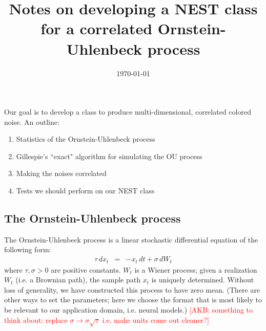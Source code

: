\documentclass[11pt]{article}
\newcommand{\Acomment}[1]{\textcolor{red}{[AKB: #1]}}
\begin{document}
\title{Notes on developing a NEST class for a correlated Ornstein-Uhlenbeck process }
\author{}
\date{\today}
\maketitle

Our goal is to develop a class to produce multi-dimensional, correlated colored noise. 
 An outline:
\begin{enumerate}
\item Statistics of the Ornstein-Uhlenbeck process
\item Gillespie's ``exact" algorithm for simulating the OU process 
\item Making the noises correlated
\item Tests we should perform on our NEST class
\end{enumerate}

\subsection*{The Ornstein-Uhlenbeck process}
The Ornstein-Uhlenbeck process is a linear stochastic differential equation of the following form:
\begin{eqnarray}
\tau \, dx_t & = & - x_t \, dt + \sigma \, dW_t
\end{eqnarray}
where $\tau, \sigma > 0$ are positive constants. $W_t$ is a Wiener process; given a realization $W_t$ (i.e.  a Brownian path),  the sample path $x_t$ is uniquely determined. Without loss of generality, we have constructed this process to have zero mean.
(There are other ways to set the parameters; here we choose the format that is most likely to be relevant to our application domain, i.e. neural models.)
\Acomment{something to think about: replace $\sigma \rightarrow \sigma \sqrt{\tau}$ i.e. make units come out cleaner?}
\end{document}
